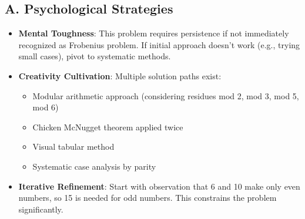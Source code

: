\documentclass[12pt]{article}
\begin{document}
\begin{strategicbox}
\subsection*{A. Psychological Strategies}
\begin{itemize}[leftmargin=*]
    \item \textbf{Mental Toughness}: This problem requires persistence if not immediately recognized as Frobenius problem. If initial approach doesn't work (e.g., trying small cases), pivot to systematic methods.
    \item \textbf{Creativity Cultivation}: Multiple solution paths exist:
    \begin{itemize}
        \item Modular arithmetic approach (considering residues mod 2, mod 3, mod 5, mod 6)
        \item Chicken McNugget theorem applied twice
        \item Visual tabular method
        \item Systematic case analysis by parity
    \end{itemize}
    \item \textbf{Iterative Refinement}: Start with observation that 6 and 10 make only even numbers, so 15 is needed for odd numbers. This constrains the problem significantly.
\end{itemize}


\end{strategicbox}
\end{document}
